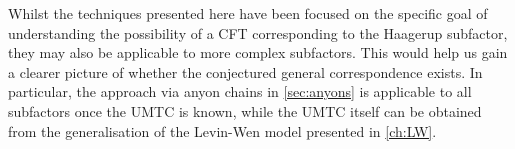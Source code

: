 Whilst the techniques presented here have been focused on the specific goal of understanding the possibility of a CFT corresponding to the Haagerup subfactor, they may also be applicable to more complex subfactors. This would help us gain a clearer picture of whether the conjectured general correspondence exists. In particular, the approach via anyon chains in \cref{sec:anyons} is applicable to all subfactors once the UMTC is known, while the UMTC itself can be obtained from the generalisation of the Levin-Wen model presented in \cref{ch:LW}.


